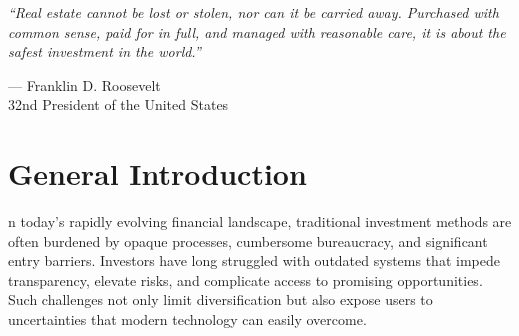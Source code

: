 \thispagestyle{empty}

\vspace*{\fill}

\begin{center}
\begin{minipage}{1\textwidth}
    \begin{center}
        \large\itshape ``Real estate cannot be lost or stolen, nor can it be carried away. Purchased with common sense, paid for in full, and managed with reasonable care, it is about the safest investment in the world.''\cite{RooseveltRealEstateQuote}
        \vspace{1cm}
        
        \normalfont\textcolor{primary}{— Franklin D. Roosevelt}\\
        \small\textcolor{secondary}{32nd President of the United States}
    \end{center}
\end{minipage}
\end{center}

\vspace*{\fill}

\newpage
\thispagestyle{empty}

\chapter*{\centering General Introduction}
\vspace{-1cm} %



\begingroup %
\setlength{\parindent}{0pt} %
\setlength{\parskip}{0.15em} %
\footnotesize %

n today's rapidly evolving financial landscape, traditional investment methods are often burdened by opaque processes, cumbersome bureaucracy, and significant entry barriers. Investors have long struggled with outdated systems that impede transparency, elevate risks, and complicate access to promising opportunities. Such challenges not only limit diversification but also expose users to uncertainties that modern technology can easily overcome.

